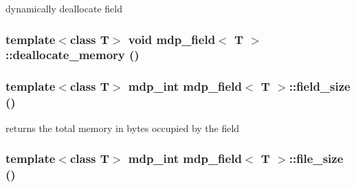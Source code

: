 dynamically deallocate field \hypertarget{classmdp__field_a3c2b219b116a0bb1cb340c3e06c37657}{
\subsubsection[{deallocate\_\-memory}]{\setlength{\rightskip}{0pt plus 5cm}template$<$class T$>$ void {\bf mdp\_\-field}$<$ T $>$::deallocate\_\-memory ()}}
\label{classmdp__field_a3c2b219b116a0bb1cb340c3e06c37657}
\hypertarget{classmdp__field_a6eff9dbb7dd88313ae2294c0178c4c74}{
\subsubsection[{field\_\-size}]{\setlength{\rightskip}{0pt plus 5cm}template$<$class T$>$ {\bf mdp\_\-int} {\bf mdp\_\-field}$<$ T $>$::field\_\-size ()}}
\label{classmdp__field_a6eff9dbb7dd88313ae2294c0178c4c74}


returns the total memory in bytes occupied by the field \hypertarget{classmdp__field_ac6e5d57963f865e92cc59c3e9943fb3d}{
\subsubsection[{file\_\-size}]{\setlength{\rightskip}{0pt plus 5cm}template$<$class T$>$ {\bf mdp\_\-int} {\bf mdp\_\-field}$<$ T $>$::file\_\-size ()}}
\label{classmdp__field_ac6e5d57963f865e92cc59c3e9943fb3d}


